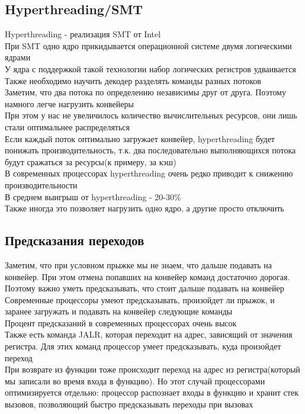 \documentclass[12pt]{article}
\begin{document}
\subsection{Hyperthreading/SMT}
Hyperthreading - реализация SMT от Intel\\
При SMT одно ядро прикидывается операционной системе двумя логическими ядрами\\
У ядра с поддержкой такой технологии набор логических регистров удваивается\\
Также необходимо научить декодер разделять команды разных потоков\\
Заметим, что два потока по определению независимы друг от друга. Поэтому намного легче нагрузить конвейеры\\
При этом у нас не увеличилось количество вычислительных ресурсов, они лишь стали оптимальнее распределяться\\
Если каждый поток оптимально загружает конвейер, hyperthreading будет понижать производительность, т.к. два последовательно выполняющихся потока будут сражаться за ресурсы(к примеру, за кэш)\\
В современных процессорах hyperthreading очень редко приводит к снижению производительности\\
В среднем выигрыш от hyperthreading - 20-30\%\\
Также иногда это позволяет нагрузить одно ядро, а другие просто отключить\\
\subsection{Предсказания переходов}
Заметим, что при условном прыжке мы не знаем, что дальше подавать на конвейер. При этом отмена попавших на конвейер команд достаточно дорогая. Поэтому важно уметь предсказывать, что стоит дальше подавать на конвейер\\
Современные процессоры умеют предсказывать, произойдет ли прыжок, и заранее загружать и подавать на конвейер следующие команды\\
Процент предсказаний в современных процессорах очень высок\\
Также есть команда JALR, которая переходит на адрес, зависящий от значения регистра. Для этих команд процессор умеет предсказывать, куда произойдет переход\\
При возврате из функции тоже происходит переход на адрес из регистра(который мы записали во время входа в функцию). Но этот случай процессорами оптимизируется отдельно: процессор распознает входы в функцию и хранит стек вызовов, позволяющий быстро предсказывать переходы при вызовах\\
\end{document}

